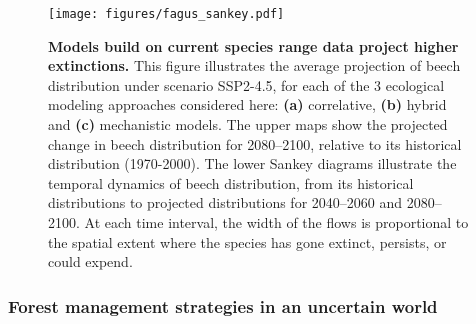 \documentclass[11pt,letter]{article}
\begin{document}
\begin{figure}
	\centering
	\texttt{[image: figures/fagus\_sankey.pdf]}
	\caption{\textbf{Models build on current species range data project higher extinctions.} This figure illustrates the average projection of beech distribution under scenario SSP2-4.5, for each of the 3 ecological modeling approaches considered here: \textbf{(a)} correlative, \textbf{(b)} hybrid and \textbf{(c)} mechanistic models. The upper maps show the projected change in beech distribution for 2080–2100, relative to its historical distribution (1970-2000). The lower Sankey diagrams illustrate the temporal dynamics of beech distribution, from its historical distributions to projected distributions for 2040–2060 and 2080–2100. At each time interval, the width of the flows is proportional to the spatial extent where the species has gone extinct, persists, or could expend. }
	\label{fig:diffproj}
\end{figure}

\subsubsection*{Forest management strategies in an uncertain world}
\end{document}
